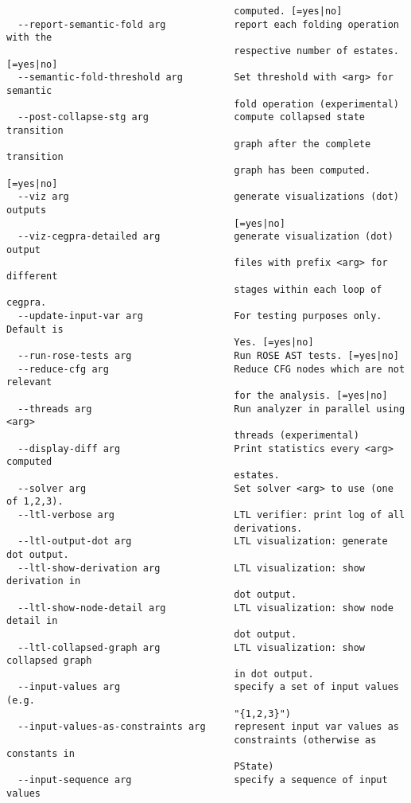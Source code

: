 \documentclass[natbib]{article}
\begin{document}
\begin{verbatim}
                                        computed. [=yes|no]
  --report-semantic-fold arg            report each folding operation with the 
                                        respective number of estates. [=yes|no]
  --semantic-fold-threshold arg         Set threshold with <arg> for semantic 
                                        fold operation (experimental)
  --post-collapse-stg arg               compute collapsed state transition 
                                        graph after the complete transition 
                                        graph has been computed. [=yes|no]
  --viz arg                             generate visualizations (dot) outputs 
                                        [=yes|no]
  --viz-cegpra-detailed arg             generate visualization (dot) output 
                                        files with prefix <arg> for different 
                                        stages within each loop of cegpra.
  --update-input-var arg                For testing purposes only. Default is 
                                        Yes. [=yes|no]
  --run-rose-tests arg                  Run ROSE AST tests. [=yes|no]
  --reduce-cfg arg                      Reduce CFG nodes which are not relevant
                                        for the analysis. [=yes|no]
  --threads arg                         Run analyzer in parallel using <arg> 
                                        threads (experimental)
  --display-diff arg                    Print statistics every <arg> computed 
                                        estates.
  --solver arg                          Set solver <arg> to use (one of 1,2,3).
  --ltl-verbose arg                     LTL verifier: print log of all 
                                        derivations.
  --ltl-output-dot arg                  LTL visualization: generate dot output.
  --ltl-show-derivation arg             LTL visualization: show derivation in 
                                        dot output.
  --ltl-show-node-detail arg            LTL visualization: show node detail in 
                                        dot output.
  --ltl-collapsed-graph arg             LTL visualization: show collapsed graph
                                        in dot output.
  --input-values arg                    specify a set of input values (e.g. 
                                        "{1,2,3}")
  --input-values-as-constraints arg     represent input var values as 
                                        constraints (otherwise as constants in 
                                        PState)
  --input-sequence arg                  specify a sequence of input values 

\end{verbatim}
\end{document}
